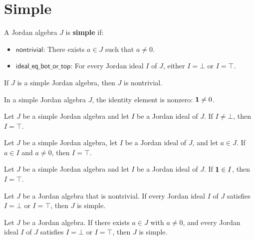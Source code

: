 \section{Simple}

\begin{definition}[IsSimpleJordan]
A Jordan algebra $J$ is \textbf{simple} if:
\begin{itemize}
  \item $\mathsf{nontrivial}$: There exists $a \in J$ such that $a \ne 0$.
  \item $\mathsf{ideal\_eq\_bot\_or\_top}$: For every Jordan ideal $I$ of $J$, either $I = \bot$ or $I = \top$.
\end{itemize}
\end{definition}

\begin{proposition}
If $J$ is a simple Jordan algebra, then $J$ is nontrivial.
\end{proposition}

\begin{theorem}
In a simple Jordan algebra $J$, the identity element is nonzero: $\mathbf{1} \ne 0$.
\end{theorem}

\begin{theorem}
Let $J$ be a simple Jordan algebra and let $I$ be a Jordan ideal of $J$. If $I \ne \bot$, then $I = \top$.
\end{theorem}

\begin{theorem}
Let $J$ be a simple Jordan algebra, let $I$ be a Jordan ideal of $J$, and let $a \in J$. If $a \in I$ and $a \ne 0$, then $I = \top$.
\end{theorem}

\begin{theorem}
Let $J$ be a simple Jordan algebra and let $I$ be a Jordan ideal of $J$. If $\mathbf{1} \in I$, then $I = \top$.
\end{theorem}

\begin{theorem}[IsSimpleJordan.mk']
Let $J$ be a Jordan algebra that is nontrivial. If every Jordan ideal $I$ of $J$ satisfies $I = \bot$ or $I = \top$, then $J$ is simple.
\end{theorem}

\begin{theorem}
Let $J$ be a Jordan algebra. If there exists $a \in J$ with $a \ne 0$, and every Jordan ideal $I$ of $J$ satisfies $I = \bot$ or $I = \top$, then $J$ is simple.
\end{theorem}
